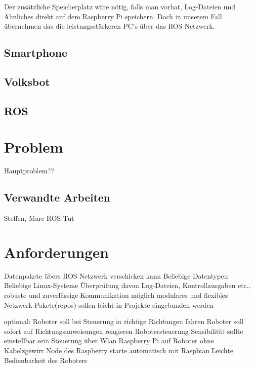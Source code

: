 \documentclass[12pt]{article}
\begin{document}
Der zusätzliche Speicherplatz wäre nötig, falls man vorhat, Log-Dateien und Ähnliches direkt auf dem Raspberry Pi speichern. 
Doch in unserem Fall übernehmen das die leistungsstärkeren PC's über das ROS Netzwerk.






\subsection{Smartphone}

\subsection{Volksbot}

\subsection{ROS}



\section{Problem}

Hauptproblem??

\subsection{Verwandte Arbeiten}

Steffen, Marc
ROS-Tut

\section{Anforderungen}

Datenpakete übers ROS Netzwerk verschicken kann
Beliebige Datentypen
Beliebige Linux-Systeme
Überprüfung davon Log-Dateien, Kontrollausgaben etc..
robuste und zuverlässige Kommunikation möglich
modulares und flexibles Netzwerk
Pakete(repos) sollen leicht in Projekte eingebunden werden

optional:
Roboter soll bei Steuerung in richtige Richtungen fahren
Roboter soll sofort auf Richtungsanweisungen reagieren
Robotersteuerung Sensibilität sollte einstellbar sein
Steuerung über Wlan
Raspberry Pi auf Roboter ohne Kabelzgewirr
Node des Raspberry starte automatisch mit Raspbian
Leichte Bedienbarkeit des Roboters
\end{document}
